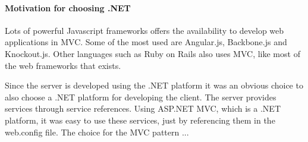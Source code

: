 \documentclass[../report.tex]{subfiles}
\begin{document}
\paragraph{Motivation for choosing .NET}
Lots of powerful Javascript frameworks offers the availability to develop web applications in MVC. Some of the most used are Angular.js, Backbone.js and Knockout.js. Other languages such as Ruby on Rails also uses MVC, like most of the web frameworks that exists.

Since the server is developed using the .NET platform it was an obvious choice to also choose a .NET platform for developing the client. The server provides services through service references. Using ASP.NET MVC, which is a .NET platform, it was easy to use these services, just by referencing them in the web.config file. The choice for the MVC pattern ...
\end{document}
